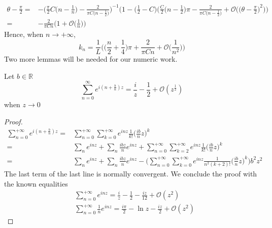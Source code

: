 \begin{equation*}
\begin{split}
\theta - \frac{\pi}{ 2} = & 
-\bigg(\frac{\pi}{2} C \big( n- \frac 1 n \big) - \frac{ 2}{ \pi C \big(n - \frac{ 1 }{2} \big)} \bigg)^{-1}
\bigg( 1 - \big(\frac{ 1}{ 2} - C \big)\Big( \frac C 2 \big( n - \frac{ 1}{ 2} \big) \pi - \frac{2}{\pi C\big(n- \frac{1}{2}\big)} + \mathcal{O}\Big(\big(\theta - \frac \pi 2 \big)^2\Big)\bigg) \\
%
=& -\frac{2}{\pi C n}\Big( 1 + \mathcal{O}\big( \frac 1 n\big) \Big)
\end{split}
\end{equation*}
Hence, when $n\rightarrow +\infty$, 
\begin{equation*}
k_n = \frac 1 L \Big( \big( \frac n 2 + \frac 1 4 \big)\pi + \frac{2}{\pi C n}+ \mathcal{O}\big(\frac{1}{n^2}\big) \Big)
\end{equation*}
Two more lemmas will be needed for our numeric work.
\begin{lemma}
Let $b\in\mathbb{R}$
\begin{equation*}
\sum_{n=0}^\infty e^{i(n+\frac b n)z} = \frac i z - \frac 1 2 + \mathcal{O}(z^{\frac 1 2})
\end{equation*}
when $z\rightarrow 0 $
\end{lemma}
\begin{proof}
\begin{equation*}
\begin{split}
\sum_{n=0}^{+\infty} e^{i(n+\frac b n)z} = & 
\sum_{n=0}^{+\infty} \sum_{k=0}^{+\infty} e^{inz} \frac{1}{k!}\big(\frac{ib}{n}z\big)^k \\
%
= & \sum_n e^{inz} + \sum_n \frac{ibz}{n}e^{inz} + \sum_{n=0}^{+\infty} \sum_{k=2}^{+\infty} e^{inz} \frac{1}{k!}\big(\frac{ib}{n}z\big)^k  \\
%
= & \sum_n e^{inz} + \sum_n \frac{ibz}{n}e^{inz} - 
\bigg(\sum_{n=0}^{+\infty} \sum_{k=0}^{+\infty} 
e^{inz} \frac{1}{n^2(k+2)!}\big(\frac{ib}{n}z\big)^k 
\bigg)b^2z^2
\end{split}
\end{equation*}
The last term of the last line is normally convergent.
We conclude the proof with the known equalities
\begin{equation*}
\begin{split}
& \sum_{n=0}^{+\infty}e^{inz} = 
\frac i z - \frac 1 2 - \frac{iz}{12} + \mathcal{O}(z^2) \\
%
& \sum_{n=0}^{+\infty}\frac 1 n e^{inz} =
\frac{i\pi}{2} - \ln z - \frac{iz}{2} + \mathcal{O}(z^2)
\end{split}
\end{equation*}
\end{proof}
